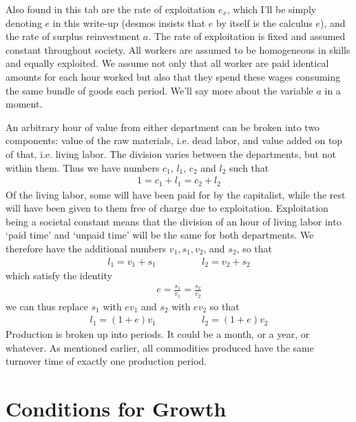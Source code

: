 \documentclass{article}
\theoremstyle{theorem}
\begin{document}
Also found in this tab are the rate of exploitation $e_x$, which I'll be simply denoting $e$ in this write-up (desmos insists that $e$ by itself is the calculus $e$), and the rate of surplus reinvestment $a$. The rate of exploitation is fixed and assumed constant throughout society. All workers are assumed to be homogeneous in skills and equally exploited. We assume not only that all worker are paid identical amounts for each hour worked but also that they spend these wages consuming the same bundle of goods each period. We'll say more about the variable $a$ in a moment. \par 
An arbitrary hour of value from either department can be broken into two components: value of the raw materials, i.e. dead labor, and value added on top of that, i.e. living labor. The division varies between the departments, but not within them. Thus we have numbers $c_1$, $l_1$, $c_2$ and $l_2$ such that
\begin{align}
	1 = c_1+l_1 = c_2+l_2
\end{align}
Of the living labor, some will have been paid for by the capitalist, while the rest will have been given to them free of charge due to exploitation. Exploitation being a societal constant means that the division of an hour of living labor into `paid time' and `unpaid time' will be the same for both departments. We therefore have the additional numbers $v_1,s_1,v_2$, and $s_2$, so that
\begin{align}
	l_1 = v_1+s_1 \hspace{2cm} l_2 = v_2+s_2
\end{align} 
which satisfy the identity
\begin{align}
	e = \frac{s_1}{v_1} = \frac{s_2}{v_2}
\end{align} 
we can thus replace $s_1$ with $ev_1$ and $s_2$ with $ev_2$ so that
\begin{align}
	l_1 = (1+e)v_1 \hspace{2cm} l_2 = (1+e)v_2 
\end{align} 
Production is broken up into periods. It could be a month, or a year, or whatever. As mentioned earlier, all commodities produced have the same turnover time of exactly one production period.  
\section{Conditions for Growth}
\end{document}

